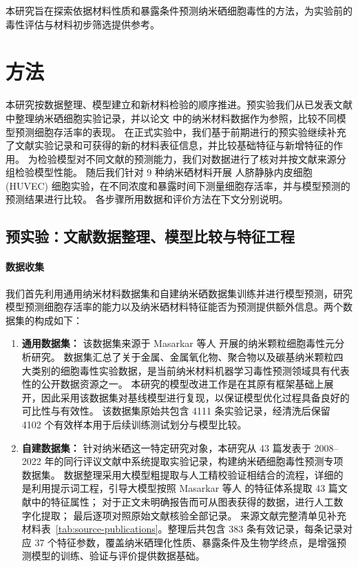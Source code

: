 \documentclass[letterpaper]{article}
\begin{document}
本研究旨在探索依据材料性质和暴露条件预测纳米硒细胞毒性的方法，为实验前的毒性评估与材料初步筛选提供参考。

\section{方法}

本研究按数据整理、模型建立和新材料检验的顺序推进。预实验我们从已发表文献中整理纳米硒细胞实验记录，并以论文 \cite{masarkar2024} 中的纳米材料数据作为参照，比较不同模型预测细胞存活率的表现。
在正式实验中，我们基于前期进行的预实验继续补充了文献实验记录和可获得的新的材料表征信息，并比较基础特征与新增特征的作用。
为检验模型对不同文献的预测能力，我们对数据进行了核对并按文献来源分组检验模型性能。
随后我们针对 9 种纳米硒材料开展 人脐静脉内皮细胞(HUVEC) 细胞实验，在不同浓度和暴露时间下测量细胞存活率，并与模型预测的预测结果进行比较。
各步骤所用数据和评价方法在下文分别说明。

\subsection{预实验：文献数据整理、模型比较与特征工程}

\paragraph{数据收集}
我们首先利用通用纳米材料数据集和自建纳米硒数据集训练并进行模型预测，研究模型预测细胞存活率的能力以及纳米硒材料特征能否为预测提供额外信息。两个数据集的构成如下：
\begin{enumerate}
  \item \textbf{通用数据集：}
该数据集来源于 Masarkar 等人 \cite{masarkar2024} 开展的纳米颗粒细胞毒性元分析研究。
数据集汇总了关于金属、金属氧化物、聚合物以及碳基纳米颗粒四大类别的细胞毒性实验数据，是当前纳米材料机器学习毒性预测领域具有代表性的公开数据资源之一。
本研究的模型改进工作是在其原有框架基础上展开，因此采用该数据集对基线模型进行复现，以保证模型优化过程具备良好的可比性与有效性。
该数据集原始共包含 4111 条实验记录，经清洗后保留 4102 个有效样本用于后续训练测试划分与模型比较。

  \item \textbf{自建数据集：}
针对纳米硒这一特定研究对象，本研究从 43 篇发表于 2008--2022 年的同行评议文献中系统提取实验记录，构建纳米硒细胞毒性预测专项数据集。
数据整理采用大模型粗提取与人工精校验证相结合的流程，详细的是利用提示词工程，引导大模型按照 Masarkar 等人\cite{masarkar2024} 的特征体系提取 43 篇文献中的特征属性；
对于正文未明确报告而可从图表获得的数据，进行人工数字化提取；
最后逐项对照原始文献核验全部记录。
来源文献完整清单见补充材料表~\ref{tab:source-publications}。整理后共包含 383 条有效记录，每条记录对应 37 个特征参数，覆盖纳米硒理化性质、暴露条件及生物学终点，是增强预测模型的训练、验证与评价提供数据基础。
\end{enumerate}
\end{document}
